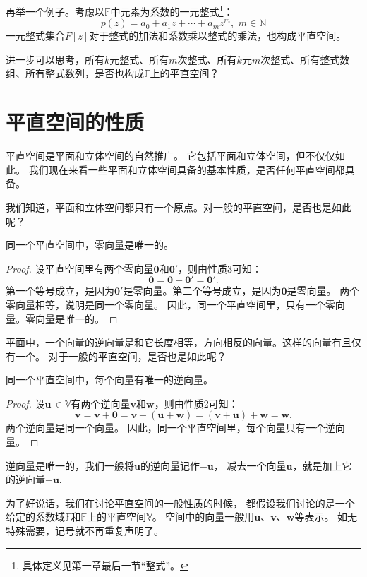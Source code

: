 \documentclass[12pt,UTF8,fontset=none]{ctexbook}
\begin{document}
再举一个例子。考虑以$\mathbb{F}$中元素为系数的一元整式\footnote{具体定义见第一章最后一节“整式”。}：
$$ p(z) = a_0 + a_1 z + \cdots + a_m z^m, \,\, m \in \mathbb{N} $$
一元整式集合$F[z]$对于整式的加法和系数乘以整式的乘法，也构成平直空间。

进一步可以思考，所有$k$元整式、所有$m$次整式、所有$k$元$m$次整式、所有整式数组、所有整式数列，是否也构成$\mathbb{F}$上的平直空间？

\section{平直空间的性质}
平直空间是平面和立体空间的自然推广。
它包括平面和立体空间，但不仅仅如此。
我们现在来看一些平面和立体空间具备的基本性质，是否任何平直空间都具备。

我们知道，平面和立体空间都只有一个原点。对一般的平直空间，是否也是如此呢？

\begin{pp}\label{pp:1_1}
同一个平直空间中，零向量是唯一的。
\end{pp} 
\begin{proof} %
    设平直空间里有两个零向量$\mathbf{0}$和$\mathbf{0}'$，则由性质3可知：
    $$ \mathbf{0} = \mathbf{0} + \mathbf{0}' = \mathbf{0}'.$$
    第一个等号成立，是因为$\mathbf{0}'$是零向量。第二个等号成立，是因为$\mathbf{0}$是零向量。
    两个零向量相等，说明是同一个零向量。
    因此，同一个平直空间里，只有一个零向量。零向量是唯一的。
\end{proof}
 

平面中，一个向量的逆向量是和它长度相等，方向相反的向量。这样的向量有且仅有一个。
对于一般的平直空间，是否也是如此呢？
\begin{pp}\label{pp:1_2}
同一个平直空间中，每个向量有唯一的逆向量。
\end{pp} 
\begin{proof} %
    设$\mathbf{u} \, \in \mathbb{V}$有两个逆向量$\mathbf{v}$和$\mathbf{w}$，则由性质2可知：
    $$ \mathbf{v} = \mathbf{v} + \mathbf{0} = \mathbf{v} + (\mathbf{u}+\mathbf{w}) = (\mathbf{v}+\mathbf{u}) + \mathbf{w} = \mathbf{w}.$$
    两个逆向量是同一个向量。
    因此，同一个平直空间里，每个向量只有一个逆向量。
\end{proof}
 
逆向量是唯一的，我们一般将$\mathbf{u}$的逆向量记作$-\mathbf{u}$，
减去一个向量$\mathbf{u}$，就是加上它的逆向量$-\mathbf{u}$.

为了好说话，我们在讨论平直空间的一般性质的时候，
都假设我们讨论的是一个给定的系数域$\mathbb{F}$和$\mathbb{F}$上的平直空间$\mathbb{V}$。
空间中的向量一般用$\mathbf{u}$、$\mathbf{v}$、$\mathbf{w}$等表示。
如无特殊需要，记号就不再重复声明了。
\end{document}
